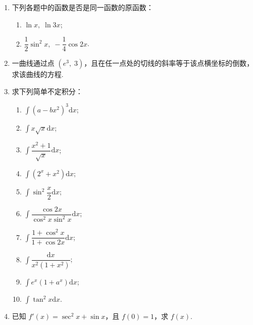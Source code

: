 \begin{enumerate}\setlength{\itemsep}{7pt}
    \item 下列各题中的函数是否是同一函数的原函数：
    \begin{enumerate}[(1)]\setlength{\itemsep}{5pt}\setlength{\topsep}{15pt}
        \item $\ln x,\;\ln 3x$;
        \item $\dfrac{1}{2}\sin^2x,\;-\dfrac{1}{4}\cos 2x$.
    \end{enumerate}

    \item 一曲线通过点 $(e^3,\;3)$，且在任一点处的切线的斜率等于该点横坐标的倒数，
    求该曲线的方程.
    
    \item 求下列简单不定积分：
    \begin{enumerate}[(1)]\setlength{\itemsep}{5pt}\setlength{\topsep}{15pt}
        \item $\displaystyle\int(a-bx^2)^3\text{d}x$;
        \item $\displaystyle\int x\sqrt{x}\text{d}x$;
        \item $\displaystyle\int \dfrac{x^2+1}{\sqrt{x}}\text{d}x$;
        \item $\displaystyle\int (2^x+x^2)\text{d}x$;
        \item $\displaystyle\int \sin^2\dfrac{x}{2}\text{d}x$;
        \item $\displaystyle\int\dfrac{\cos 2x}{\cos^2x\sin^2x}\text{d}x$;
        \item $\displaystyle\int\dfrac{1+\cos^2x}{1+\cos2x}\text{d}x$;
        \item $\displaystyle\int\dfrac{\text{d}x}{x^2(1+x^2)}$;
        \item $\displaystyle\int e^x(1+a^x)\text{d}x$;
        \item $\displaystyle\int \tan^2x\text{d}x$.
    \end{enumerate}

    \item 已知 $f'(x)=\sec^2x+\sin x$，且 $f(0)=1$，求 $f(x)$.
    

\end{enumerate}
